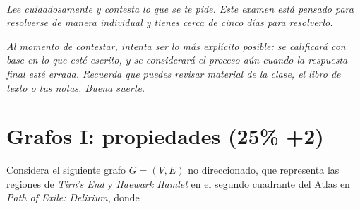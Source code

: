 \documentclass{article}
\title{
    \myclass \\
    \textbf{\mytitle} \\
    \myheader
    \date{}
}
\begin{document}
\maketitle

\vspace{-1.5cm}

{%
\footnotesize
\textit{Lee cuidadosamente y contesta lo que se te pide.
Este examen está pensado para resolverse de manera individual y tienes cerca de cinco días para resolverlo.}

\textit{Al momento de contestar, intenta ser lo más explícito posible: se calificará con base en lo que esté escrito, y se considerará el proceso aún cuando la respuesta final esté errada.
Recuerda que puedes revisar material de la clase, el libro de texto o tus notas.
Buena suerte.}
}

\section{Grafos I: propiedades (25\% +2)}

Considera el siguiente grafo $G = (V, E)$ no direccionado, que representa las regiones de \textit{Tirn's End} y \textit{Haewark Hamlet} en el segundo cuadrante del Atlas en \textit{Path of Exile: Delirium}, donde
\end{document}
